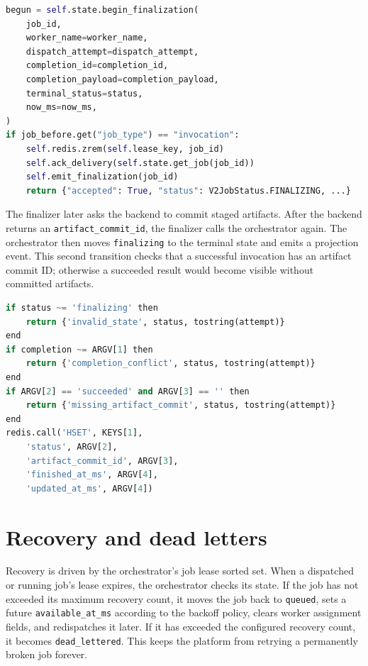 \documentclass[12pt,a4paper]{report}
\newcommand{\state}[1]{\texttt{#1}}
\newcommand{\file}[1]{\texttt{#1}}
\begin{document}
\begin{lstlisting}[language=Python,caption={Invocation completion acceptance from scheduler/production\_orchestrator.py.}]
begun = self.state.begin_finalization(
    job_id,
    worker_name=worker_name,
    dispatch_attempt=dispatch_attempt,
    completion_id=completion_id,
    completion_payload=completion_payload,
    terminal_status=status,
    now_ms=now_ms,
)
if job_before.get("job_type") == "invocation":
    self.redis.zrem(self.lease_key, job_id)
    self.ack_delivery(self.state.get_job(job_id))
    self.emit_finalization(job_id)
    return {"accepted": True, "status": V2JobStatus.FINALIZING, ...}
\end{lstlisting}

The finalizer later asks the backend to commit staged artifacts. After the
backend returns an \file{artifact\_commit\_id}, the finalizer calls the
orchestrator again. The orchestrator then moves \state{finalizing} to the
terminal state and emits a projection event. This second transition checks that
a successful invocation has an artifact commit ID; otherwise a succeeded result
would become visible without committed artifacts.

\begin{lstlisting}[language=Python,caption={Finalization guard from scheduler/orchestrator\_state.py.}]
if status ~= 'finalizing' then
    return {'invalid_state', status, tostring(attempt)}
end
if completion ~= ARGV[1] then
    return {'completion_conflict', status, tostring(attempt)}
end
if ARGV[2] == 'succeeded' and ARGV[3] == '' then
    return {'missing_artifact_commit', status, tostring(attempt)}
end
redis.call('HSET', KEYS[1],
    'status', ARGV[2],
    'artifact_commit_id', ARGV[3],
    'finished_at_ms', ARGV[4],
    'updated_at_ms', ARGV[4])
\end{lstlisting}

\section{Recovery and dead letters}

Recovery is driven by the orchestrator's job lease sorted set. When a dispatched
or running job's lease expires, the orchestrator checks its state. If the job
has not exceeded its maximum recovery count, it moves the job back to
\state{queued}, sets a future \file{available\_at\_ms} according to the backoff
policy, clears worker assignment fields, and redispatches it later. If it has
exceeded the configured recovery count, it becomes \state{dead\_lettered}. This
keeps the platform from retrying a permanently broken job forever.
\end{document}

